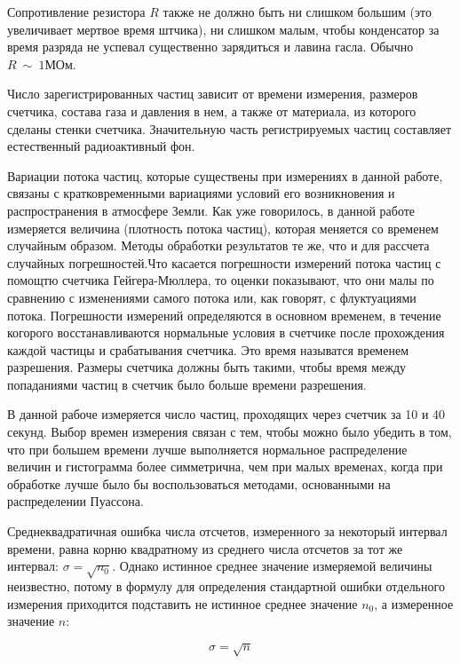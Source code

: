 \documentclass[14pt]{article}
\begin{document}
Сопротивление резистора $R$ также не должно быть ни слишком большим (это увеличивает мертвое время штчика), ни слишком малым, чтобы конденсатор за время разряда не успевал существенно зарядиться и лавина гасла. Обычно $~$ $R~\sim~1\text{МОм}$.

Число зарегистрированных частиц зависит от времени измерения, размеров счетчика, состава газа и давления в нем, а также от материала, из которого сделаны стенки счетчика. Значительную часть регистрируемых частиц составляет естественный радиоактивный фон.

Вариации потока частиц, которые существены при измерениях в данной работе, связаны с кратковременными вариациями условий его
возникновения и распространения в атмосфере Земли. Как уже говорилось, в данной работе измеряется величина (плотность потока частиц), которая меняется со временем случайным образом. Методы обработки результатов те же, что и для рассчета случайных погрешностей.Что касается погрешности измерений потока частиц с помощтю счетчика Гейгера-Мюллера, то оценки показывают, что они малы по сравнению с изменениями самого потока или, как говорят, с флуктуациями потока. Погрешности измерений определяются в основном временем, в течение когорого восстанавливаются нормальные условия в счетчике после прохождения каждой частицы и срабатывания счетчика. Это время называтся временем разрешения. Размеры счетчика должны быть такими, чтобы время между попаданиями частиц в счетчик было больше времени разрешения.

В данной рабоче измеряется число частиц, проходящих через счетчик за 10 и 40 секунд. Выбор времен измерения связан с тем, чтобы можно было убедить в том, что при большем времени лучше выполняется нормальное распределение величин и гистограмма более симметрична, чем при малых временах, когда при обработке лучше было бы воспользоваться методами, основанными на распределении Пуассона. 

\vspace{0.5cm}
Среднеквадратичная ошибка числа отсчетов, измеренного за некоторый интервал времени, равна корню квадратному из среднего числа отсчетов за тот же интервал: $\sigma = \sqrt{n_0}$. Однако истинное среднее значение измеряемой величины неизвестно, потому в формулу для определения стандартной ошибки отдельного измерения приходится подставить не истинное среднее значение $n_0$, а измеренное значение $n$:

\begin{equation}
\sigma = \sqrt{n}
\end{equation}
\end{document}
